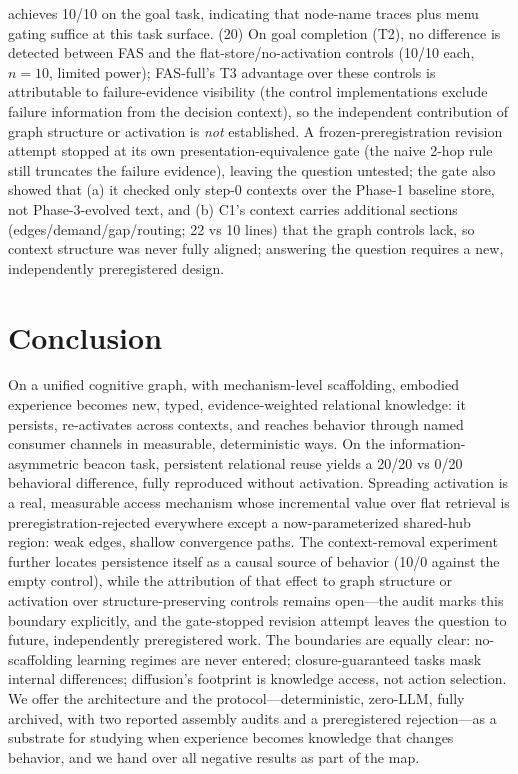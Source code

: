 \documentclass[10pt,a4paper]{article}
\begin{document}
achieves 10/10 on the goal task, indicating that node-name traces plus menu gating suffice at this task surface. (20) On goal completion (T2), no difference is detected between FAS and the flat-store/no-activation controls (10/10 each, $n{=}10$, limited power); FAS-full's T3 advantage over these controls is attributable to failure-evidence visibility (the control implementations exclude failure information from the decision context), so the independent contribution of graph structure or activation is \emph{not} established. A frozen-preregistration revision attempt stopped at its own presentation-equivalence gate (the naive 2-hop rule still truncates the failure evidence), leaving the question untested; the gate also showed that (a) it checked only step-0 contexts over the Phase-1 baseline store, not Phase-3-evolved text, and (b) C1's context carries additional sections (edges/demand/gap/routing; 22 vs 10 lines) that the graph controls lack, so context structure was never fully aligned; answering the question requires a new, independently preregistered design.

\section{Conclusion}
On a unified cognitive graph, with mechanism-level scaffolding, embodied experience becomes new, typed, evidence-weighted relational knowledge: it persists, re-activates across contexts, and reaches behavior through named consumer channels in measurable, deterministic ways. On the information-asymmetric beacon task, persistent relational reuse yields a 20/20 vs 0/20 behavioral difference, fully reproduced without activation. Spreading activation is a real, measurable access mechanism whose incremental value over flat retrieval is preregistration-rejected everywhere except a now-parameterized shared-hub region: weak edges, shallow convergence paths. The context-removal experiment further locates persistence itself as a causal source of behavior (10/0 against the empty control), while the attribution of that effect to graph structure or activation over structure-preserving controls remains open---the audit marks this boundary explicitly, and the gate-stopped revision attempt leaves the question to future, independently preregistered work. The boundaries are equally clear: no-scaffolding learning regimes are never entered; closure-guaranteed tasks mask internal differences; diffusion's footprint is knowledge access, not action selection. We offer the architecture and the protocol---deterministic, zero-LLM, fully archived, with two reported assembly audits and a preregistered rejection---as a substrate for studying when experience becomes knowledge that changes behavior, and we hand over all negative results as part of the map.
\end{document}

